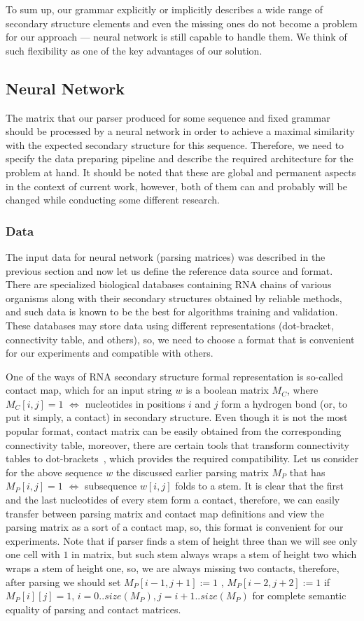 To sum up, our grammar explicitly or implicitly describes a wide range of secondary structure elements and even the missing ones do not become a problem for our approach --- neural network is still capable to handle them. We think of such flexibility as one of the key advantages of our solution.

\subsection{Neural Network}
The matrix that our parser produced for some sequence and fixed grammar should be processed by a neural network in order to achieve a maximal similarity with the expected secondary structure for this sequence. Therefore, we need to specify the data preparing pipeline and describe the required architecture for the problem at hand. It should be noted that these are global and permanent aspects in the context of current work, however, both of them can and probably will be changed while conducting some different research.

\subsubsection{Data}
The input data for neural network (parsing matrices) was described in the previous section and now let us define the reference data source and format. There are specialized biological databases containing RNA chains of various organisms along with their secondary structures obtained by reliable methods, and such data is known to be the best for algorithms training and validation. These databases may store data using different representations (dot-bracket, connectivity table, and others), so, we need to choose a format that is convenient for our experiments and compatible with others.

One of the ways of RNA secondary structure formal representation is so-called contact map, which for an input string $w$ is a boolean matrix $M_C$, where $M_C [i,j] = 1$ $\iff$ nucleotides in positions $i$ and $j$ form a hydrogen bond (or, to put it simply, a contact) in secondary structure. Even though it is not the most popular format, contact matrix can be easily obtained from the corresponding connectivity table, moreover, there are certain tools that transform connectivity tables to dot-brackets~\cite{bellaousov2013rnastructure}, which provides the required compatibility. Let us consider for the above sequence $w$ the discussed earlier parsing matrix $M_P$ that has $M_P[i, j] = 1$ $\iff$ subsequence $w[i, j]$ folds to a stem. It is clear that the first and the last nucleotides of every stem form a contact, therefore, we can easily transfer between parsing matrix and contact map definitions and view the parsing matrix as a sort of a contact map, so, this format is convenient for our experiments. Note that if parser finds a stem of height three than we will see only one cell with $1$ in matrix, but such stem always wraps a stem of height two which wraps a stem of height one, so, we are always missing two contacts, therefore, after parsing we should set $M_P[i - 1, j + 1] := 1$ , $M_P[i - 2, j + 2] := 1$ if $M_P[i][j] = 1$, $i = 0..size(M_P), j = i + 1..size(M_P)$ for complete semantic equality of parsing and contact matrices.

